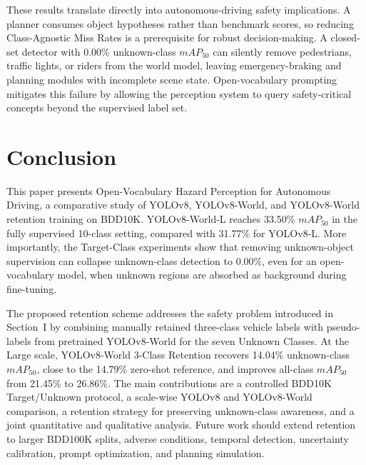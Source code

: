 \documentclass[conference]{IEEEtran}
\begin{document}
These results translate directly into autonomous-driving safety implications. A planner consumes object hypotheses rather than benchmark scores, so reducing Class-Agnostic Miss Rates is a prerequisite for robust decision-making. A closed-set detector with 0.00\% unknown-class $mAP_{50}$ can silently remove pedestrians, traffic lights, or riders from the world model, leaving emergency-braking and planning modules with incomplete scene state. Open-vocabulary prompting mitigates this failure by allowing the perception system to query safety-critical concepts beyond the supervised label set.

\section{Conclusion}

This paper presents Open-Vocabulary Hazard Perception for Autonomous Driving, a comparative study of YOLOv8, YOLOv8-World, and YOLOv8-World retention training on BDD10K. YOLOv8-World-L reaches 33.50\% $mAP_{50}$ in the fully supervised 10-class setting, compared with 31.77\% for YOLOv8-L. More importantly, the Target-Class experiments show that removing unknown-object supervision can collapse unknown-class detection to 0.00\%, even for an open-vocabulary model, when unknown regions are absorbed as background during fine-tuning.

The proposed retention scheme addresses the safety problem introduced in Section~I by combining manually retained three-class vehicle labels with pseudo-labels from pretrained YOLOv8-World for the seven Unknown Classes. At the Large scale, YOLOv8-World 3-Class Retention recovers 14.04\% unknown-class $mAP_{50}$, close to the 14.79\% zero-shot reference, and improves all-class $mAP_{50}$ from 21.45\% to 26.86\%. The main contributions are a controlled BDD10K Target/Unknown protocol, a scale-wise YOLOv8 and YOLOv8-World comparison, a retention strategy for preserving unknown-class awareness, and a joint quantitative and qualitative analysis. Future work should extend retention to larger BDD100K splits, adverse conditions, temporal detection, uncertainty calibration, prompt optimization, and planning simulation.





\end{document}

